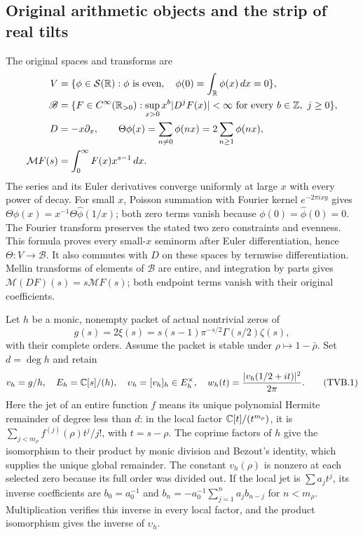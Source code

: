 \subsection[\hspace{0.4em}Original arithmetic objects and the strip of real tilts]{Original arithmetic objects and the strip of real tilts}

The original spaces and transforms are
\[
 \begin{split}
 V&=\{\phi\in\mathcal S(\mathbb R):\phi\text{ is even},\quad
                     \phi(0)=\int_\mathbb R\phi(x)\,dx=0\},\\
 \mathscr B&=\{F\in C^\infty(\mathbb R_{>0}):
       \sup_{x>0}x^b|D^jF(x)|<\infty
           \text{ for every }b\in\mathbb Z,\ j\ge0\},\\
 D&=-x\partial_x,\qquad
 \Theta\phi(x)=\sum_{n\ne0}\phi(nx)=2\sum_{n\ge1}\phi(nx),\\
 \mathcal MF(s)&=\int_0^\infty F(x)x^{s-1}\,dx.
 \end{split}
\]
The series and its Euler derivatives converge uniformly at large
$x$ with every power of decay. For small $x$, Poisson summation
with Fourier kernel $e^{-2\pi ixy}$ gives
$\Theta\phi(x)=x^{-1}\Theta\widehat\phi(1/x)$; both zero terms
vanish because $\phi(0)=\widehat\phi(0)=0$.
The Fourier transform preserves the stated two zero constraints
and evenness. This formula proves every small-$x$ seminorm after
Euler differentiation, hence $\Theta:V\to\mathscr B$.
It also commutes with $D$ on these spaces by termwise differentiation.
Mellin transforms of elements of $\mathscr B$ are entire, and
integration by parts gives $\mathcal M(DF)(s)=s\mathcal MF(s)$;
both endpoint terms vanish with their original coefficients.

Let $h$ be a monic, nonempty packet of actual nontrivial zeros of
\[
 g(s)=2\xi(s)=s(s-1)\pi^{-s/2}\Gamma(s/2)\zeta(s),
\]
with their complete orders. Assume the packet is stable under
$\rho\mapsto1-\bar\rho$. Set $d=\deg h$ and retain
\[
 v_h=g/h,\quad E_h=\mathbb C[s]/(h),\quad
 \upsilon_h=[v_h]_h\in E_h^\times,\quad
 w_h(t)=\frac{|v_h(1/2+it)|^2}{2\pi}.
 \tag{TVB.1}
\]
Here the jet of an entire function $f$ means its unique polynomial
Hermite remainder of degree less than $d$: in the local factor
$\mathbb C[t]/(t^{m_\rho})$, it is
$\sum_{j<m_\rho}f^{(j)}(\rho)t^j/j!$, with $t=s-\rho$.
The coprime factors of $h$ give the isomorphism to their product
by monic division and Bezout's identity, which supplies the
unique global remainder. The constant $v_h(\rho)$ is nonzero
at each selected zero because its full order was divided out.
If the local jet is $\sum a_jt^j$, its inverse coefficients are
$b_0=a_0^{-1}$ and
$b_n=-a_0^{-1}\sum_{j=1}^n a_jb_{n-j}$ for $n<m_\rho$.
Multiplication verifies this inverse in every local factor,
and the product isomorphism gives the inverse of $\upsilon_h$.

